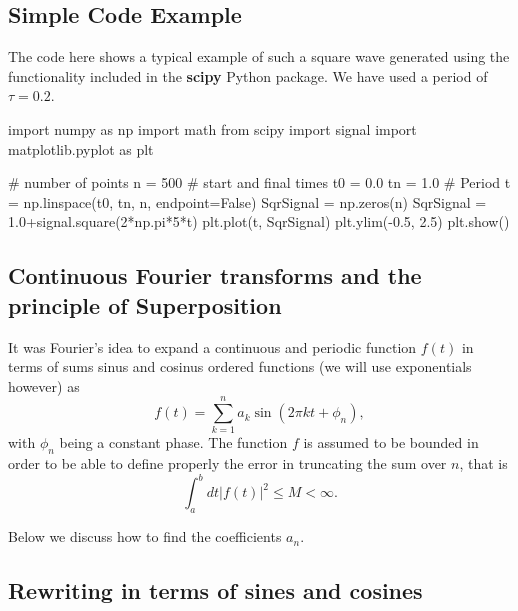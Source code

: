 \documentclass[%
oneside,                 %
final,                   %
10pt]{article}
\begin{document}
\subsection{Simple Code Example}

The code here shows a typical example of such a square wave generated
using the functionality included in the \textbf{scipy} Python package. We
have used a period of $\tau=0.2$.



















\bpycod
import numpy as np
import math
from scipy import signal
import matplotlib.pyplot as plt

# number of points                                                                                       
n = 500
# start and final times                                                                                  
t0 = 0.0
tn = 1.0
# Period                                                                                                 
t = np.linspace(t0, tn, n, endpoint=False)
SqrSignal = np.zeros(n)
SqrSignal = 1.0+signal.square(2*np.pi*5*t)
plt.plot(t, SqrSignal)
plt.ylim(-0.5, 2.5)
plt.show()

\epycod


\subsection{Continuous Fourier transforms and the principle of Superposition}

It was Fourier's idea to expand a continuous and periodic function $f(t)$ in terms of sums sinus and cosinus ordered functions (we will use exponentials however)
as
\[
f(t) = \sum_{k=1}^{n}a_k\sin{(2\pi kt+\phi_n)},
\]
with $\phi_n$ being a constant phase. The function $f$ is assumed to be bounded in order to be able to define properly the error in truncating the sum
over $n$, that is
\[
\int_a^b dt \vert f(t)\vert^2 \le M < \infty.
\]

Below we discuss how to find the coefficients $a_n$.

\subsection{Rewriting in terms of sines and cosines}
\end{document}
